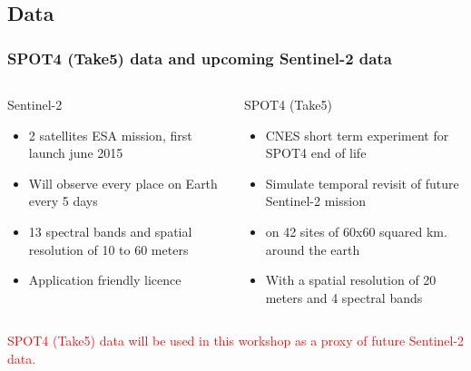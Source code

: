 \documentclass[8pt]{beamer}
\begin{document}
\subsection{Data}
\begin{frame}

\frametitle{SPOT4 (Take5) data and upcoming Sentinel-2 data}

\begin{columns}[t]
\begin{column}{5cm}
\begin{block}{Sentinel-2}
\begin{itemize}
\item 2 satellites ESA mission, first launch june 2015
\item Will observe every place on Earth every 5 days
\item 13 spectral bands and spatial resolution of 10 to 60 meters
\item Application friendly licence
\end{itemize}
\end{block}
\end{column}
\begin{column}{5cm}
\begin{block}{SPOT4 (Take5)}
\begin{itemize}
\item CNES short term experiment for SPOT4 end of life
\item Simulate temporal revisit of future Sentinel-2 mission
\item on 42 sites of 60x60 squared km. around the earth
\item With a spatial resolution of 20 meters and 4 spectral bands
\end{itemize}
\end{block}
\end{column}
\end{columns}

\textcolor{red}{SPOT4 (Take5) data will be used in this workshop as a proxy of future Sentinel-2 data.}

\end{frame}
\end{document}
